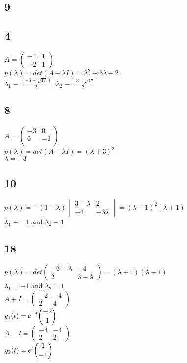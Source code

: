 \documentclass[12pt, a4paper]{IEEEtran}
\begin{document}
\begin{flushleft}
    \section*{9}
    \subsection*{4}
    $A=\begin{pmatrix}
        -4&1\\
        -2&1
        \end{pmatrix}$\\
    $p(\lambda)=det(A-\lambda I)=\lambda^2+3\lambda-2$\\
    $\lambda_1=\frac{(-3-\sqrt{17})}{2}$, $\lambda_2=\frac{-3-\sqrt{17}}{2}$\\

    \subsection*{8}
    $A=\begin{pmatrix}
        -3&0\\
        0&-3\\
    \end{pmatrix}$\\
    $p(\lambda)=det(A-\lambda I)=(\lambda +3)^2$\\
    $\lambda=-3$

    \subsection*{10}
    $p(\lambda)=-(1-\lambda)\begin{vmatrix}
        3-\lambda&2\\
        -4&-3\lambda
    \end{vmatrix}=(\lambda-1)^2(\lambda+1)$\\
    $\lambda_1=-1$ and $\lambda_2=1$
    
    \subsection*{18}
    $p(\lambda)=det\begin{pmatrix}
        -3-\lambda&-4\\
        2&3-\lambda
    \end{pmatrix}=(\lambda+1)(\lambda-1)$\\
    $\lambda_1=-1$ and $\lambda_2=1$\\
    $A+I=\begin{pmatrix}
        -2&-4\\
        2&4
    \end{pmatrix}$\\
    $y_1(t)=e^{-t}\dbinom{-2}{1}$\\
    $A-I=\begin{pmatrix}
        -4&-4\\
        2&2
    \end{pmatrix}$\\
    $y_2(t)=e^t\dbinom{1}{-1}$\\
    

\end{flushleft}
\end{document}
